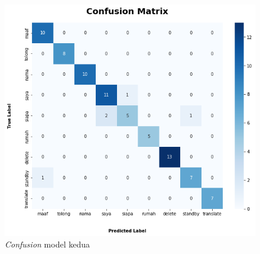 \begin{figure}[H]
  \centering

  \includegraphics[scale=0.55]{gambar/bab4-uji-model-second-cf.png}

  \caption{\emph{Confusion} model kedua}
  \label{fig:model2-cf}
\end{figure}

